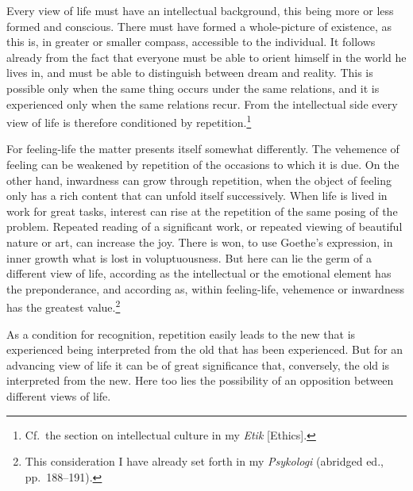 \documentclass[12pt]{book}
\newcommand{\opage}[1]{\marginnote{\footnotesize\textit{[#1]}}}
\begin{document}
Every view of life must have an intellectual background, this being more or less formed and conscious. There
must have formed a whole-picture of existence, as this is, in greater or smaller compass, accessible to the
individual. It follows already from the fact that everyone must be able to orient himself in the world he lives
in, and must be able to distinguish between dream and reality. This is possible only when the same thing occurs
under the same relations, and it is experienced only when the same relations recur. From the intellectual side
every view of life is therefore conditioned by repetition.\footnote{Cf.\ the section on intellectual culture in
my \textit{Etik} [Ethics].}

\opage{67}For feeling-life the matter presents itself somewhat differently. The vehemence of feeling can be weakened by
repetition of the occasions to which it is due. On the other hand, inwardness can grow through repetition, when
the object of feeling only has a rich content that can unfold itself successively. When life is lived in work for
great tasks, interest can rise at the repetition of the same posing of the problem. Repeated reading of a
significant work, or repeated viewing of beautiful nature or art, can increase the joy. There is won, to use
Goethe's expression, in inner growth what is lost in voluptuousness. But here can lie the germ of a different
view of life, according as the intellectual or the emotional element has the preponderance, and according as,
within feeling-life, vehemence or inwardness has the greatest value.\footnote{This consideration I have already
set forth in my \textit{Psykologi} (abridged ed., pp.\ 188--191).}

As a condition for recognition, repetition easily leads to the new that is experienced being interpreted from the
old that has been experienced. But for an advancing view of life it can be of great significance that, conversely,
the old is interpreted from the new. Here too lies the possibility of an opposition between different views of
life.
\end{document}

